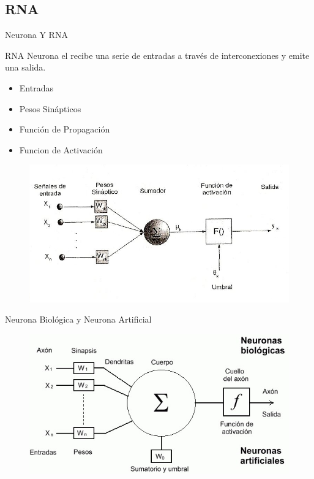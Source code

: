 \documentclass{beamer}
\begin{document}
\subsection{RNA}
\begin{frame}{Neurona Y RNA}
\begin{block}{RNA}
Neurona el recibe una serie de entradas a través de interconexiones y emite una salida.\pause
\begin{itemize}
\item {Entradas\pause}
\item {Pesos Sinápticos\pause}
\item {Función de Propagación\pause}
\item {Funcion de Activación}
\end{itemize}
\begin{figure}
\includegraphics[scale=0.3]{rna.png}
\centering
\end{figure}
\end{block}
\end{frame}

\begin{frame}
\begin{center}
\begin{block}{Neurona Biológica y Neurona Artificial}
\begin{figure}
\includegraphics[scale=0.4]{Rna.png}
\centering
\end{figure}
\end{block}
\end{center}
\end{frame}
\end{document}
